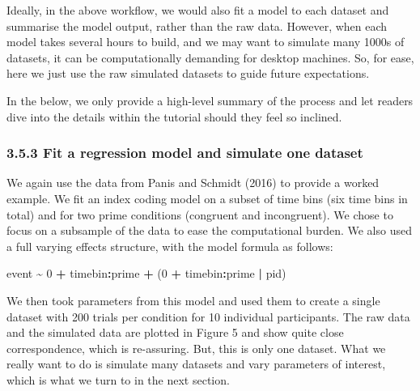 \documentclass[
  man, donotrepeattitle,floatsintext]{apa6}
\newenvironment{Shaded}{\begin{snugshade}}{\end{snugshade}}
\newcommand{\DecValTok}[1]{\textcolor[rgb]{0.00,0.00,0.81}{#1}}
\newcommand{\NormalTok}[1]{#1}
\newcommand{\SpecialCharTok}[1]{\textcolor[rgb]{0.81,0.36,0.00}{\textbf{#1}}}
\begin{document}
Ideally, in the above workflow, we would also fit a model to each dataset and summarise the model output, rather than the raw data. However, when each model takes several hours to build, and we may want to simulate many 1000s of datasets, it can be computationally demanding for desktop machines. So, for ease, here we just use the raw simulated datasets to guide future expectations.

In the below, we only provide a high-level summary of the process and let readers dive into the details within the tutorial should they feel so inclined.

\subsubsection{3.5.3 Fit a regression model and simulate one dataset}\label{fit-a-regression-model-and-simulate-one-dataset}

We again use the data from Panis and Schmidt (2016) to provide a worked example.
We fit an index coding model on a subset of time bins (six time bins in total) and for two prime conditions (congruent and incongruent). We chose to focus on a subsample of the data to ease the computational burden. We also used a full varying effects structure, with the model formula as follows:

\begin{Shaded}
\begin{Highlighting}[]
\NormalTok{event }\SpecialCharTok{\textasciitilde{}} \DecValTok{0} \SpecialCharTok{+}\NormalTok{ timebin}\SpecialCharTok{:}\NormalTok{prime }\SpecialCharTok{+}\NormalTok{ (}\DecValTok{0} \SpecialCharTok{+}\NormalTok{ timebin}\SpecialCharTok{:}\NormalTok{prime }\SpecialCharTok{|}\NormalTok{ pid)}
\end{Highlighting}
\end{Shaded}

We then took parameters from this model and used them to create a single dataset with 200 trials per condition for 10 individual participants. The raw data and the simulated data are plotted in Figure 5 and show quite close correspondence, which is re-assuring. But, this is only one dataset. What we really want to do is simulate many datasets and vary parameters of interest, which is what we turn to in the next section.
\end{document}

